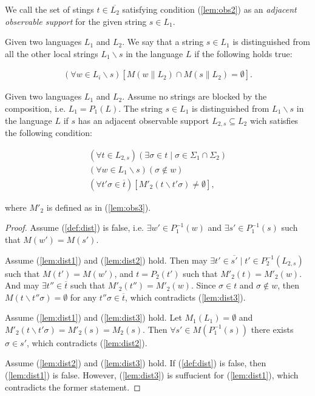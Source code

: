 \documentclass[a4paper, 10pt, conference]{ieeeconf}
\begin{document}
We call the set of stings $t \in \overline{L_2}$ satisfying condition
(\ref{lem:obs2}) as an \emph{adjacent observable support} for the given string
$s \in L_1$.

\begin{definition} Given two languages $L_1$ and $L_2$. We say that a string $s
\in L_{1}$ is distinguished from all the other local strings $L_1\backslash s$
in the language $L$ if the following holds true:
\end{definition}
\begin{equation}
\label{def:dist}
\begin{array}{l}
	(\forall w \in L_i\backslash s)
	\left[M(w \parallel L_2) \cap M(s\parallel L_2) = \emptyset\right].
\end{array}
\end{equation}

\begin{lemma}
\label{lem:distinguished}
Given two languages $L_1$ and $L_2$. Assume no strings are blocked by the
composition, i.e. $L_1 = P_1(L)$. The string $s \in L_1$ is distinguished from
$L_1\backslash s$ in the language $L$ if $s$ has an adjacent observable support
$L_{2,s} \subseteq L_2$ wich satisfies the following condition:
\end{lemma}
\begin{subequations}
\begin{align}
	(\forall t \in L_{2,s})
	(\exists \sigma \in t \mid \sigma \in \Sigma_1 \cap \Sigma_2)
	\label{lem:dist1}
	\\
	(\forall w \in L_1\backslash s)(\sigma \not \in w)
	\label{lem:dist2}
	\\
	(\forall t'\sigma \in \overline{t})
	[M'_2(t\backslash t'\sigma) \neq \emptyset]
	\label{lem:dist3},
\end{align}
\end{subequations}

where $M'_2$ is defined as in (\ref{lem:obs3}). 

\begin{proof}
Assume (\ref{def:dist}) is false, i.e. $\exists w' \in P_1^{-1}(w)$ and $\exists
s' \in P_1^{-1}(s)$ such that $M(w') = M(s')$. 

Assume (\ref{lem:dist1}) and (\ref{lem:dist2}) hold. Then may $\exists t' \in
\overline{s'} \mid t' \in P_2^{-1}(L_{2,s})$ such that $M(t') = M(w')$, and $t =
P_2(t')$ such that $M'_2(t) = M'_2(w)$. And may $\exists t'' \in \overline{t}$
such that $M'_2(t'') = M'_2(w)$. Since $\sigma \in t$ and $\sigma \not \in w$,
then $M(t \backslash t''\sigma) = \emptyset$ for any $t''\sigma \in
\overline{t}$, which contradicts (\ref{lem:dist3}).

Assume (\ref{lem:dist1}) and (\ref{lem:dist3}) hold. Let $M_1(L_1) = \emptyset$
and $M'_2(t\backslash t'\sigma) = M'_2(s) = M_2(s)$. Then $\forall s' \in
M(P_1^{-1}(s))$ there exists $\sigma \in s'$, which contradicts
(\ref{lem:dist2}).

Assume (\ref{lem:dist2}) and (\ref{lem:dist3}) hold. If (\ref{def:dist}) is
false, then (\ref{lem:dist1}) is false. However, (\ref{lem:dist3}) is suffucient
for (\ref{lem:dist1}), which contradicts the former statement.
\end{proof}
\end{document}
